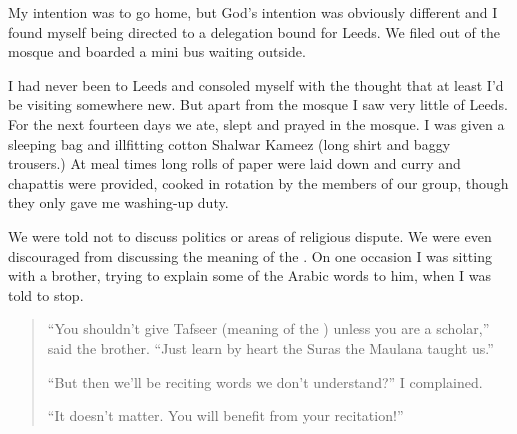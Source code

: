 \documentclass[12pt]{memoir}
\begin{document}
My intention was to go home, but God’s intention was obviously different
and I found myself being directed to a delegation bound for Leeds.
We filed out of the mosque and boarded a mini bus waiting outside.

I had never been to Leeds and consoled myself with the thought
that at least I’d be visiting somewhere new.
But apart from the mosque I saw very little of Leeds.
For the next fourteen days we ate, slept and prayed in the mosque.
I was given a sleeping bag and ill\–fitting cotton Shalwar Kameez
(long shirt and baggy trousers.)
At meal times long rolls of paper were laid down
and curry and chapattis were provided,
cooked in rotation by the members of our group,
though they only gave me washing-up duty.

We were told not to discuss politics or areas of religious dispute.
We were even discouraged from discussing the meaning of the \Quran.
On one occasion I was sitting with a brother,
trying to explain some of the Arabic words to him, when I was told to stop.

\begin{quote}
“You shouldn’t give Tafseer (meaning of the \Quran) unless you are a scholar,”
said the brother.
“Just learn by heart the Suras the Maulana taught us.”

“But then we’ll be reciting words we don’t understand?” I complained.

“It doesn’t matter. You will benefit from your recitation!”
\end{quote}
\end{document}
